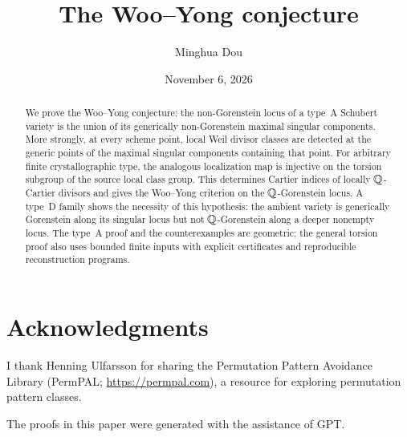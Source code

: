 \documentclass[11pt,reqno]{amsart}
\title[The Woo--Yong conjecture]{The Woo--Yong conjecture}
\author{Minghua Dou}
\date{November 6, 2026}
\begin{document}
\begin{abstract}
We prove the Woo--Yong conjecture: the non-Gorenstein locus of a type~A Schubert variety is the union of its generically non-Gorenstein maximal singular components. More strongly, at every scheme point, local Weil divisor classes are detected at the generic points of the maximal singular components containing that point. For arbitrary finite crystallographic type, the analogous localization map is injective on the torsion subgroup of the source local class group. This determines Cartier indices of locally $\mathbb Q$-Cartier divisors and gives the Woo--Yong criterion on the $\mathbb Q$-Gorenstein locus. A type~D family shows the necessity of this hypothesis: the ambient variety is generically Gorenstein along its singular locus but not $\mathbb Q$-Gorenstein along a deeper nonempty locus. The type~A proof and the counterexamples are geometric; the general torsion proof also uses bounded finite inputs with explicit certificates and reproducible reconstruction programs.
\end{abstract}
\maketitle
\tableofcontents
\clearpage
\setcounter{section}{-1}








\section*{Acknowledgments}
I thank Henning Ulfarsson for sharing the Permutation Pattern Avoidance Library (PermPAL; \url{https://permpal.com}), a resource for exploring permutation pattern classes.

The proofs in this paper were generated with the assistance of GPT.

\clearpage

\end{document}

